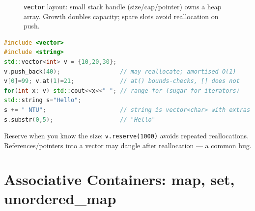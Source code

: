 \begin{figure}[h]\centering
{}
\caption{\texttt{vector} layout: small stack handle (size/cap/pointer) owns a heap array. Growth doubles capacity; spare slots avoid reallocation on push.}
\label{fig:vector-layout}
\end{figure}

\begin{lstlisting}[language=C++]
#include <vector>
#include <string>
std::vector<int> v = {10,20,30};
v.push_back(40);                 // may reallocate; amortised O(1)
v[0]=99; v.at(1)=21;             // at() bounds-checks, [] does not
for(int x: v) std::cout<<x<<" "; // range-for (sugar for iterators)
std::string s="Hello";
s += " NTU";                     // string is vector<char> with extras
s.substr(0,5);                   // "Hello"
\end{lstlisting}
Reserve when you know the size: \texttt{v.reserve(1000)} avoids repeated reallocations. References/pointers into a vector may dangle after reallocation --- a common bug.

\section{Associative Containers: map, set, unordered\_map}
\label{sec:associative}

